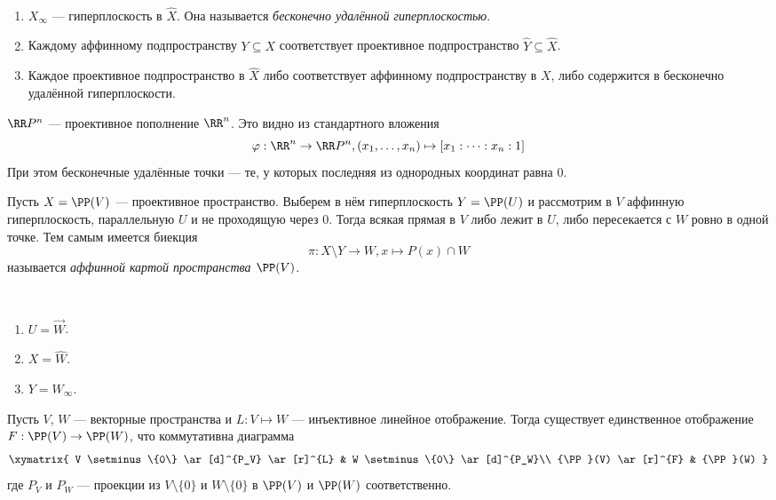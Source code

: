 \documentclass[12pt,a4paper]{article}
\begin{document}
    \begin{lemma}\ 
        \begin{enumerate}
            \item $X_\infty$ --- гиперплоскость в $\widehat{X}$. Она называется \emph{бесконечно удалённой гиперплоскостью}.
            \item Каждому аффинному подпространству $Y \subseteq X$ соответствует проективное подпространство $\widehat{Y} \subseteq \widehat{X}$.
            \item Каждое проективное подпространство в $\widehat{X}$ либо соответствует аффинному подпространству в $X$, либо содержится в бесконечно удалённой гиперплоскости.
        \end{enumerate}
    \end{lemma}

    \begin{example}
        $\RR P^n$ --- проективное пополнение $\RR^n$. Это видно из стандартного вложения
        \[\varphi: \RR^n \to \RR P^n, (x_1, \dots, x_n) \mapsto [x_1 : \dots : x_n : 1]\]
        При этом бесконечные удалённые точки --- те, у которых последняя из однородных координат равна $0$.
    \end{example}

    \begin{definition}
        Пусть $X = \PP(V)$ --- проективное пространство. Выберем в нём гиперплоскость $Y = \PP(U)$ и рассмотрим в $V$ аффинную гиперплоскость, параллельную $U$ и не проходящую через $0$. Тогда всякая прямая в $V$ либо лежит в $U$, либо пересекается с $W$ ровно в одной точке. Тем самым имеется биекция
        \[\pi: X \setminus Y \to W, x \mapsto P(x) \cap W\]
        называется \emph{аффинной картой пространства $\PP(V)$}.
    \end{definition}

    \begin{remark}\ 
        \begin{enumerate}
            \item $U = \overrightarrow{W}$.
            \item $X = \widehat{W}$.
            \item $Y = W_\infty$.
        \end{enumerate}
    \end{remark}

    \begin{theorem}
        Пусть $V$, $W$ --- векторные пространства и $L: V \mapsto W$ --- инъективное линейное отображение. Тогда существует единственное отображение $F: \PP(V) \to \PP(W)$, что коммутативна диаграмма
        \[
            \xymatrix{
                V \setminus \{0\} \ar[d]^{P_V} \ar[r]^{L} & W \setminus \{0\} \ar[d]^{P_W}\\
                {\PP}(V) \ar[r]^{F} & {\PP}(W)
            }
        \]
        где $P_V$ и $P_W$ --- проекции из $V \setminus \{0\}$ и $W \setminus \{0\}$ в $\PP(V)$ и $\PP(W)$ соответственно.
    \end{theorem}
\end{document}
